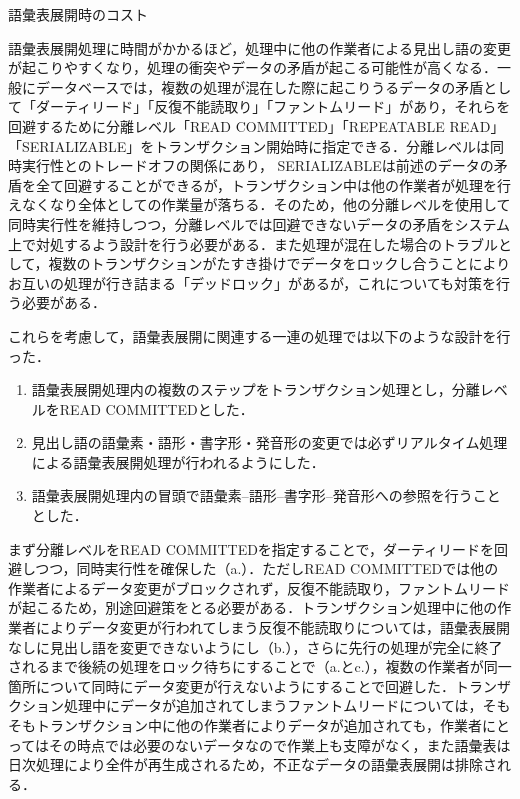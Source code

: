 \documentclass[japanese]{jnlp_1.4}
\begin{document}
\begin{table}[t]
\caption{語彙表展開時のコスト}
\label{tab7}

\end{table}

語彙表展開処理に時間がかかるほど，処理中に他の作業者による見出し語の変更が起こりやすくなり，処理の衝突やデータの矛盾が起こる可能性が高くなる．一般にデータベースでは，複数の処理が混在した際に起こりうるデータの矛盾として「ダーティリード」「反復不能読取り」「ファントムリード」があり，それらを回避するために分離レベル「READ COMMITTED」「REPEATABLE READ」「SERIALIZABLE」をトランザクション開始時に指定できる．分離レベルは同時実行性とのトレードオフの関係にあり， SERIALIZABLEは前述のデータの矛盾を全て回避することができるが，トランザクション中は他の作業者が処理を行えなくなり全体としての作業量が落ちる．そのため，他の分離レベルを使用して同時実行性を維持しつつ，分離レベルでは回避できないデータの矛盾をシステム上で対処するよう設計を行う必要がある．また処理が混在した場合のトラブルとして，複数のトランザクションがたすき掛けでデータをロックし合うことによりお互いの処理が行き詰まる「デッドロック」があるが，これについても対策を行う必要がある．

これらを考慮して，語彙表展開に関連する一連の処理では以下のような設計を行った．

\begin{enumerate}
\renewcommand{\labelenumi}{}
\item	語彙表展開処理内の複数のステップをトランザクション処理とし，分離レベルをREAD COMMITTEDとした．
\item	見出し語の語彙素・語形・書字形・発音形の変更では必ずリアルタイム処理による語彙表展開処理が行われるようにした．
\item	語彙表展開処理内の冒頭で語彙素--語形--書字形--発音形への参照を行うこととした．
\end{enumerate}

まず分離レベルをREAD COMMITTEDを指定することで，ダーティリードを回避しつつ，同時実行性を確保した（a.）．ただしREAD COMMITTEDでは他の作業者によるデータ変更がブロックされず，反復不能読取り，ファントムリードが起こるため，別途回避策をとる必要がある．トランザクション処理中に他の作業者によりデータ変更が行われてしまう反復不能読取りについては，語彙表展開なしに見出し語を変更できないようにし（b.），さらに先行の処理が完全に終了されるまで後続の処理をロック待ちにすることで（a.とc.），複数の作業者が同一箇所について同時にデータ変更が行えないようにすることで回避した．トランザクション処理中にデータが追加されてしまうファントムリードについては，そもそもトランザクション中に他の作業者によりデータが追加されても，作業者にとってはその時点では必要のないデータなので作業上も支障がなく，また語彙表は日次処理により全件が再生成されるため，不正なデータの語彙表展開は排除される．
\end{document}
